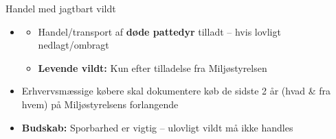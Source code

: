 \begin{frame}{Handel med jagtbart vildt}
\begin{itemize}
  \item
  \begin{itemize}
    \item Handel/transport af \textbf{døde pattedyr} tilladt – hvis lovligt nedlagt/ombragt
    \item \textbf{Levende vildt:} Kun efter tilladelse fra Miljøstyrelsen
  \end{itemize}
  \item Erhvervsmæssige købere skal dokumentere køb de sidste 2 år (hvad \& fra hvem) på Miljøstyrelsens forlangende
  \item \textbf{Budskab:} Sporbarhed er vigtig – ulovligt vildt må ikke handles
\end{itemize}
\end{frame}

